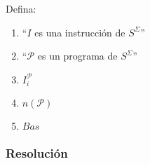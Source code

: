 \documentclass[
]{article}
\providecommand{\tightlist}{%
  \setlength{\itemsep}{0pt}\setlength{\parskip}{0pt}}
\begin{document}
Defina:

\begin{enumerate}
\def\labelenumi{\arabic{enumi}.}
\tightlist
\item
  ``\(I\) es una instrucción de \(S^\Sigma\)''
\item
  ``\(\mathcal{P}\) es un programa de \(S^\Sigma\)''
\item
  \(I_i^\mathcal{P}\)
\item
  \(n(\mathcal{P})\)
\item
  \(Bas\)
\end{enumerate}

\subsubsection{Resolución}\label{resoluciuxf3n-8}
\end{document}
